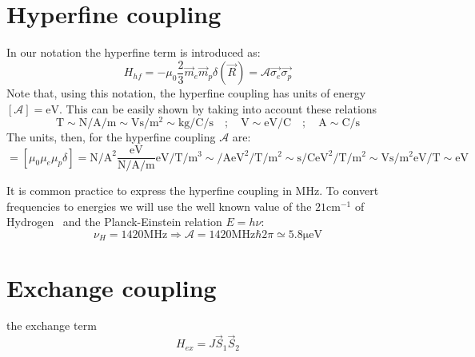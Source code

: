 \section{Hyperfine coupling}
In our notation the hyperfine term is introduced as:
\begin{equation}
  H_{hf} = -\mu_0\frac{2}{3} \vec{m}_e\vec{m}_p\delta(\vec{R}) = \mathcal{A}\vec{\sigma_e}\vec{\sigma_p}
\end{equation}
Note that, using this notation, the hyperfine coupling has units of energy $[\mathcal{A}]=\si{\eV}$. This can be easily shown by taking into account these relations
\begin{equation}
  \si{\tesla} \sim
  \si{\newton\per\ampere\per\m}\sim\si{\volt\s\per\m\squared} \sim
  \si{\kilogram\per\coulomb\per\s}  \quad;\quad
  \si{\V}\sim\si{\eV\per\coulomb}  \quad;\quad
  \si{\ampere}\sim\si{\coulomb\per\s}
\end{equation}
The units, then, for the hyperfine coupling $\mathcal{A}$ are:
\begin{equation}
  [\mathcal{A}] = \left[\mu_0\mu_e\mu_p\delta\right] =
  \si{\newton\per\ampere\squared}\frac{\si{\eV}}{\si{\newton\per\ampere\per\m}}
  \si{\eV\per\tesla}\si{\per\m\cubed} \sim
  \si{\per\ampere}\si{\eV\squared\per\tesla}\si{\per\m\squared} \sim
  \si{\s\per\coulomb}\si{\eV\squared\per\tesla}\si{\per\m\squared} \sim
  \si{\V\s\per\m\squared}\si{\eV\per\tesla}\sim \si{\eV}
\end{equation}


It is common practice to express the hyperfine coupling in $\si{\MHz}$. To convert frequencies to energies we will use the well known value of the $21\si{\cm^{-1}}$ of Hydrogen~\cite{Hellwig1970} and the Planck-Einstein relation $E=h\nu$:
\begin{equation}
  \nu_H = 1420\si{\MHz} \Rightarrow \mathcal{A} = 1420\si{\MHz}\hbar2\pi\simeq
  5.8 \si{\micro\eV}
\end{equation}


\section{Exchange coupling}
the exchange term
\begin{equation}
  H_{ex} = J\vec{S}_1\vec{S}_2
\end{equation}
